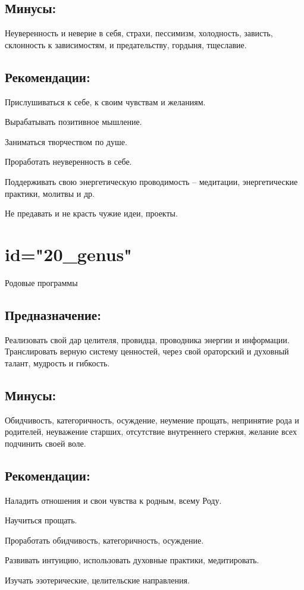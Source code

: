 \subsection{Минусы:}
Неуверенность и неверие в себя, страхи, пессимизм, холодность, 
зависть, склонность к зависимостям, и предательству, гордыня, 
тщеславие.
\endsubsection

\subsection{Рекомендации:}
\item Прислушиваться к себе, к своим чувствам и желаниям.
\item Вырабатывать позитивное мышление.
\item Заниматься творчеством по душе.
\item Проработать неуверенность в себе.
\item Поддерживать свою энергетическую проводимость – медитации, 
энергетические практики, молитвы и др.
\item Не предавать и не красть чужие идеи, проекты.
\endsubsection

\endsection

\section{id="20_genus"}{Родовые программы}

\subsection{Предназначение:}
Реализовать свой дар целителя, провидца, проводника энергии и 
информации. Транслировать верную систему ценностей, через свой 
ораторский и духовный талант, мудрость и гибкость.
\endsubsection

\subsection{Минусы:}
Обидчивость, категоричность, осуждение, неумение прощать, 
непринятие рода и родителей, неуважение старших, отсутствие 
внутреннего стержня, желание всех подчинить своей воле.
\endsubsection

\subsection{Рекомендации:}
\item Наладить отношения и свои чувства к родным, всему Роду.
\item Научиться прощать.
\item Проработать обидчивость, категоричность, осуждение.
\item Развивать интуицию, использовать духовные практики, медитировать.
\item Изучать эзотерические, целительские направления.
\endsubsection

